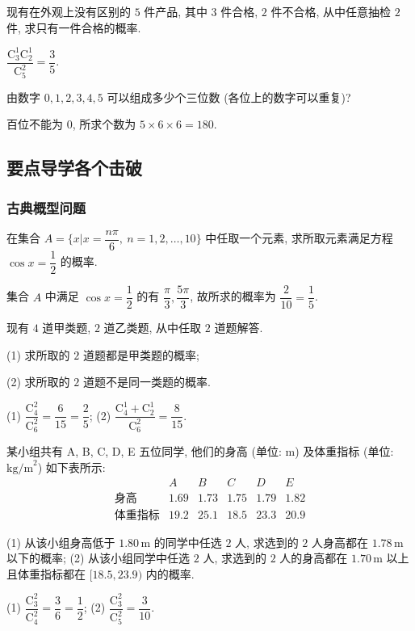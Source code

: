 \begin{exercise}
    现有在外观上没有区别的 $5$ 件产品, 其中 $3$ 件合格, $2$ 件不合格, 从中任意抽检 $2$ 件, 求只有一件合格的概率.
\end{exercise}
\beginsolution
    $\dfrac{\mathrm{C}_3^1 \mathrm{C}_2^1}{\mathrm{C}_5^2}= \dfrac35$.
\endsolution

\begin{exercise}
    由数字 $0,1,2,3,4,5$ 可以组成多少个三位数 (各位上的数字可以重复)?
\end{exercise}
\beginsolution
    百位不能为 $0$, 所求个数为 $5\times 6\times 6 = 180$.
\endsolution

\subsection{要点导学\quad 各个击破}
\subsubsection{古典概型问题}
\begin{example}
    在集合 $A=\Big\{x\Big| x=\dfrac{n\pi}6,\ n=1,2,\ldots,10\Big\}$ 中任取一个元素, 求所取元素满足方程 $\cos x=\dfrac12$ 的概率.
\end{example}
\beginsolution
    集合 $A$ 中满足 $\cos x=\dfrac12$ 的有 $\dfrac{\pi}3,\dfrac{5\pi}3$, 故所求的概率为 $\dfrac2{10}= \dfrac15$.
\endsolution

\begin{example}
    现有 $4$ 道甲类题, $2$ 道乙类题, 从中任取 $2$ 道题解答.
    
    (1) 求所取的 $2$ 道题都是甲类题的概率;
    
    (2) 求所取的 $2$ 道题不是同一类题的概率.
\end{example}
\beginsolution
    (1) $\dfrac{\mathrm{C}_4^2}{\mathrm{C}_6^2}= \dfrac6{15}= \dfrac25$;\quad
    (2) $\dfrac{\mathrm{C}_4^1+\mathrm{C}_2^1}{\mathrm{C}_6^2}= \dfrac8{15}$.
\endsolution

\begin{example}
    某小组共有 A, B, C, D, E 五位同学, 他们的身高 (单位: m) 及体重指标
    (单位: $\text{kg/m}^2$) 如下表所示:
    \[\begin{array}{c|ccccc}
        &A &B &C &D &E \\\hline
        \text{身高} &1.69 &1.73 &1.75 &1.79 &1.82\\
        \text{体重指标} &19.2 &25.1 &18.5 &23.3 &20.9
      \end{array}\]
    
    (1) 从该小组身高低于 $1.80\,\text{m}$ 的同学中任选 $2$ 人, 求选到的 $2$ 人身高都在 $1.78\,\text{m}$ 以下的概率;\qquad
    (2) 从该小组同学中任选 $2$ 人, 求选到的 $2$ 人的身高都在 $1.70\,\text{m}$ 以上且体重指标都在 $[18.5, 23.9)$ 内的概率.
\end{example}
\beginsolution
    (1) $\dfrac{\mathrm{C}_3^2}{\mathrm{C}_4^2}= \dfrac36= \dfrac12$;\quad
    (2) $\dfrac{\mathrm{C}_3^2}{\mathrm{C}_5^2}= \dfrac3{10}$.
\endsolution

